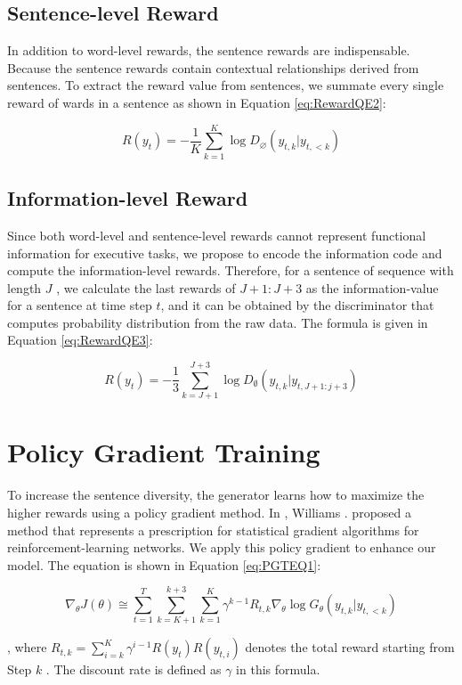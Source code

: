 \subsection{Sentence-level Reward}

In addition to word-level rewards, the sentence rewards are indispensable. Because the sentence rewards contain contextual relationships derived from sentences. To extract the reward value from sentences, we summate every single reward of wards in a sentence as shown in Equation \ref{eq:RewardQE2}:

\begin{equation}\label{eq:RewardQE2}
R\left(y_{t}\right)=-\frac{1}{K} \sum_{k=1}^{K} \log D_{\varnothing}\left(y_{t, k} | y_{t,<k}\right)
\end{equation}

\subsection{Information-level Reward}

Since both word-level and sentence-level rewards cannot represent functional information for executive tasks, we propose to encode the information code and compute the information-level rewards. Therefore, for a sentence of sequence with length $J$ , we calculate the last rewards of $J+1 : J+3$ as the information-value for a sentence at time step $t$, and it can be obtained by the discriminator that computes probability distribution from the raw data.  The formula is given in Equation \ref{eq:RewardQE3}:

\begin{equation}\label{eq:RewardQE3}
R\left(y_{t}\right)=-\frac{1}{3} \sum_{k=J+1}^{J+3} \log D_{\emptyset}\left(y_{t, k} | y_{t, J+1 : j+3}\right)
\end{equation}

\section{Policy Gradient Training}
To increase the sentence diversity, the generator learns how to maximize the higher rewards using a policy gradient method. In \cite{Simple_Statistical_Gradient-Following_Algorithms_for_Connectionist_Reinforcement_Learning}, Williams \etal. proposed a method that represents a prescription for statistical gradient algorithms for reinforcement-learning networks. We apply this policy gradient to enhance our model. The equation is shown in Equation \ref{eq:PGTEQ1}:

\begin{equation}\label{eq:PGTEQ1}
\nabla_{\theta} J(\theta) \cong \sum_{t=1}^{T} \sum_{k=K+1}^{k+3} \sum_{k=1}^{K} \gamma^{k-1} R_{t, k} \nabla_{\theta} \log G_{\theta}\left(y_{t, k} | y_{t,<k}\right)
\end{equation}

, where $R_{t, k}=\sum_{i=k}^{K} \gamma^{i-1} R\left(y_{t}\right) R\left(y_{t, i}\right)$ denotes the total reward starting from Step $k$ . The discount rate is defined as $\gamma$ in this formula.